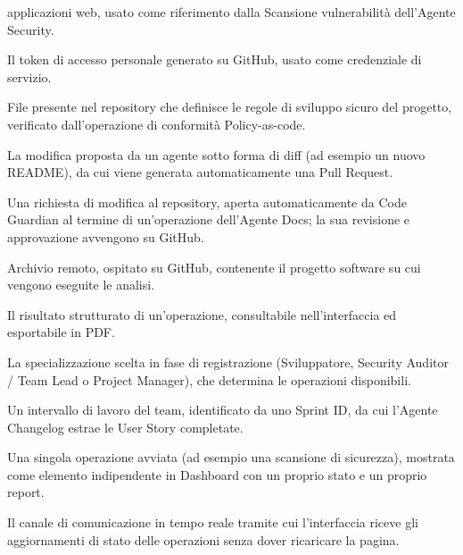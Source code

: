 \documentclass[11pt,a4paper]{article}
\begin{document}
\begin{description}[leftmargin=3.4cm, style=nextline]
    applicazioni web, usato come riferimento dalla Scansione vulnerabilità
    dell'Agente Security.
  \item[Personal Access Token (PAT)] Il token di accesso personale generato su GitHub,
    usato come credenziale di servizio.
  \item[POLICY.md] File presente nel repository che definisce le regole di sviluppo sicuro
    del progetto, verificato dall'operazione di conformità Policy-as-code.
  \item[Proposal] La modifica proposta da un agente sotto forma di diff (ad esempio un
    nuovo README), da cui viene generata automaticamente una Pull Request.
  \item[Pull Request (PR)] Una richiesta di modifica al repository, aperta automaticamente
    da Code Guardian al termine di un'operazione dell'Agente Docs; la sua revisione e
    approvazione avvengono su GitHub.
  \item[Repository] Archivio remoto, ospitato su GitHub, contenente il progetto software su cui vengono eseguite le
    analisi.
  \item[Report] Il risultato strutturato di un'operazione, consultabile nell'interfaccia
    ed esportabile in PDF.
  \item[Ruolo operativo] La specializzazione scelta in fase di registrazione (Sviluppatore,
    Security Auditor / Team Lead o Project Manager), che determina le operazioni
    disponibili.
  \item[Sprint] Un intervallo di lavoro del team, identificato da uno Sprint ID, da cui
    l'Agente Changelog estrae le User Story completate.
  \item[Task] Una singola operazione avviata (ad esempio una scansione di sicurezza),
    mostrata come elemento indipendente in Dashboard con un proprio stato e un proprio
    report.
  \item[WebSocket] Il canale di comunicazione in tempo reale tramite cui l'interfaccia
    riceve gli aggiornamenti di stato delle operazioni senza dover ricaricare la pagina.
\end{description}
\end{document}
